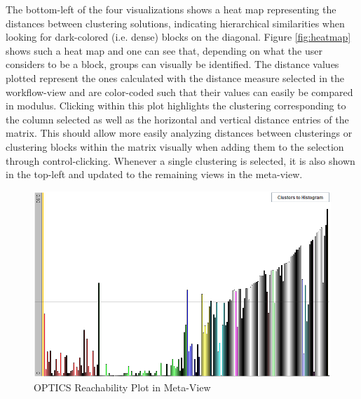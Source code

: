 \documentclass[
	a4paper,
	english,
	twoside,
	openright,               
	11pt                            
	]{report}
\begin{document}
The bottom-left of the four visualizations shows a heat map representing the distances between clustering solutions, indicating hierarchical similarities when looking for dark-colored (i.e. dense) blocks on the diagonal. Figure \ref{fig:heatmap} shows such a heat map and one can see that, depending on what the user considers to be a block, groups can visually be identified. The distance values plotted represent the ones calculated with the distance measure selected in the workflow-view and are color-coded such that their values can easily be compared in modulus. Clicking within this plot highlights the clustering corresponding to the column selected as well as the horizontal and vertical distance entries of the matrix. This should allow more easily analyzing distances between clusterings or clustering blocks within the matrix visually when adding them to the selection through control-clicking. Whenever a single clustering is selected, it is also shown in the top-left and updated to the remaining views in the meta-view.

\begin{figure}[h]
	\centering
	\includegraphics[scale=.6]{reach-plot}
	\caption{OPTICS Reachability Plot in Meta-View }
	\label{fig:opticsplot}
\end{figure}
\end{document}
